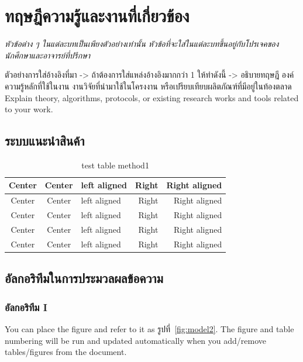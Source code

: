 \chapter{ทฤษฎีความรู้และงานที่เกี่ยวข้อง}

\emph{หัวข้อต่าง ๆ ในแต่ละบทเป็นเพียงตัวอย่างเท่านั้น หัวข้อที่จะใส่ในแต่ละบทขึ้นอยู่กับโปรเจคของนักศึกษาและอาจารย์ที่ปรึกษา}

ตัวอย่างการใส่อ้างอิงที่มา -> \cite{hypersense} ถ้าต้องการใส่แหล่งอ้างอิงมากกว่า 1 ให้ทำดังนี้ -> \cite{hypersense,bworld}
อธิบายทฤษฎี องค์ความรู้หลักที่ใช้ในงาน งานวิจัยที่นำมาใช้ในโครงงาน หรือเปรียบเทียบผลิตภัณฑ์ที่มีอยู่ในท้องตลาด\cite{bworld}
Explain theory, algorithms, protocols, or existing research works and tools related to your work.


\section{ระบบแนะนำสินค้า}

\begin{table}[!h]
    \caption{test table method1}\label{tbl:method1}
    \begin{tabular}{c|c|l|rr} \hline\hline
        Center & Center & left aligned & Right & Right aligned \\ \hline\hline
        Center & Center & left aligned & Right & Right aligned \\ \hline
        Center & Center & left aligned & Right & Right aligned \\
        Center & Center & left aligned & Right & Right aligned \\ \hline
        Center & Center & left aligned & Right & Right aligned \\ \hline\hline
    \end{tabular}
\end{table}


\section{อัลกอริทึมในการประมวลผลข้อความ}
\subsection{อัลกอริทึม I}

You can place the figure and refer to it as รูปที่~\ref{fig:model2}.
The figure and table numbering will be run and updated automatically when you add/remove tables/figures from the document.

